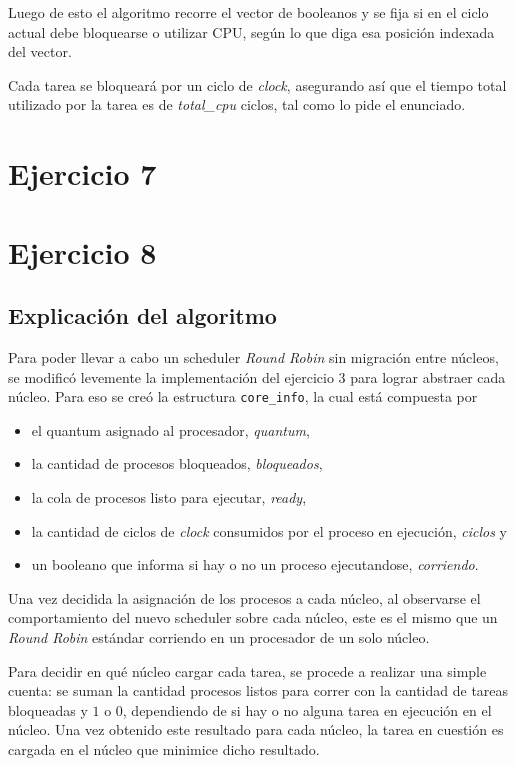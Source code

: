 \documentclass[a4paper]{article}
\begin{document}
Luego de esto el algoritmo recorre el vector de booleanos y se fija si en
el ciclo actual debe bloquearse o utilizar CPU, según lo que diga esa
posición indexada del vector. 

Cada tarea se bloqueará por un ciclo de \textit{clock}, asegurando así que
el tiempo total utilizado por la tarea es de \textit{total\_cpu} ciclos,
tal como lo pide el enunciado.


\section{Ejercicio 7}

\newpage

\section{Ejercicio 8}

\subsection{Explicación del algoritmo}
Para poder llevar a cabo un scheduler \textit{Round Robin} sin migración
entre núcleos, se modificó levemente la implementación del ejercicio 3 para
lograr abstraer cada núcleo. Para eso se creó la estructura
\verb|core_info|, la cual está compuesta por

\begin{itemize}
  \item el quantum asignado al procesador, \textit{quantum},
  \item la cantidad de procesos bloqueados, \textit{bloqueados},
  \item la cola de procesos listo para ejecutar, \textit{ready},
  \item la cantidad de ciclos de \textit{clock} consumidos por el proceso en
  ejecución, \textit{ciclos} y
  \item un booleano que informa si hay o no un proceso ejecutandose,
  \textit{corriendo}.
\end{itemize}

Una vez decidida la asignación de los procesos a cada núcleo, al observarse
el comportamiento del nuevo scheduler sobre cada núcleo, este es el mismo
que un \textit{Round Robin} estándar corriendo en un procesador de un solo
núcleo.

Para decidir en qué núcleo cargar cada tarea, se procede a realizar una
simple cuenta: se suman la cantidad procesos listos para correr con la
cantidad de tareas bloqueadas y $1$ o $0$, dependiendo de si hay o no alguna
tarea en ejecución en el núcleo. Una vez obtenido este resultado para cada
núcleo, la tarea en cuestión es cargada en el núcleo que minimice dicho
resultado.
\end{document}
